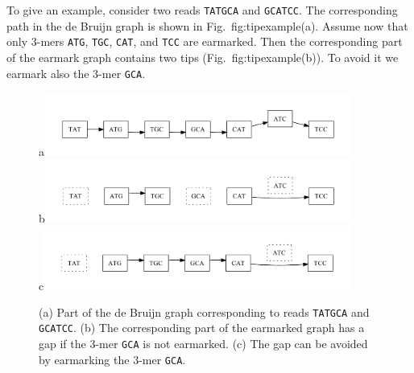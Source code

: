 \documentclass[12pt]{article}
\begin{document}
To give an example,
consider two reads {\tt TATGCA} and {\tt GCATCC}.
The corresponding path in the de Bruijn graph is shown in 
Fig.~{fig:tipexample}(a). Assume now that only $3$-mers
{\tt ATG}, {\tt TGC}, {\tt CAT}, and {\tt TCC} are earmarked.
Then the corresponding part of the earmark graph contains two tips 
(Fig.~{fig:tipexample}(b)). To avoid it we earmark also the $3$-mer
{\tt GCA}.

\begin{figure}
\caption{(a) Part of the de Bruijn graph corresponding to reads 
{\tt TATGCA} and {\tt GCATCC}. (b) The corresponding part 
of the earmarked graph has a gap if the $3$-mer {\tt GCA} is not 
earmarked. (c) The gap can be avoided by earmarking the $3$-mer 
{\tt GCA}.}\label{fig:tipexample}
\begin{center}
a\includegraphics[width=0.9\textwidth]{fig5_de.pdf}\\
b\includegraphics[width=0.9\textwidth]{fig5_ear.pdf}\\
c\includegraphics[width=0.9\textwidth]{fig5_earwotip.pdf}\\
\end{center}
\end{figure}

\end{document}

